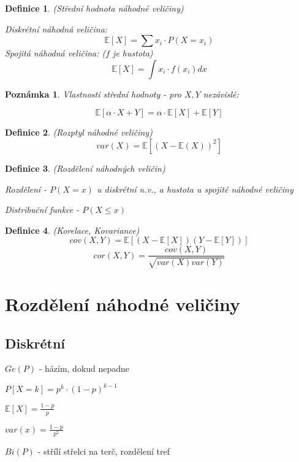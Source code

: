 \documentclass[a4paper,10pt,titlepage]{article} \usepackage[utf8]{inputenc}
\newtheorem{define}{Definice}
\newtheorem*{remark}{Poznámka}
\begin{document}
\begin{define} 
(Střední hodnota náhodné veličiny)

Diskrétní náhodná veličina:
\[
	\mathbb{E}[X] = \sum x_i \cdot P(X = x_i)
\]
Spojitá náhodná veličina: ($f$ je hustota)
\[
	\mathbb{E}[X] = \int x_i \cdot f(x_i) dx
\]
\end{define}

\begin{remark}
Vlastnosti střední hodnoty - pro $X,Y$ nezávislé:

\[
\mathbb{E}[\alpha \cdot X + Y] = \alpha \cdot \mathbb{E}[X] + \mathbb{E}[Y]
\]
\end{remark}

\begin{define} 
(Rozptyl náhodné veličiny)
\[
	var(X) = \mathbb{E}[(X - \mathbb{E} (X))^2]
\]
\end{define}

\begin{define}
(Rozdělení náhodných veličin)

Rozdělení - $P(X = x)$ u diskrétní n.v., a hustota u spojité náhodné veličiny

Distribuční funkce - $P(X \leq x)$

\end{define}

\begin{define}
(Korelace, Kovariance)
\[
cov(X,Y) = \mathbb{E}[(X-\mathbb{E}[X])(Y-\mathbb{E}[Y])]
\]
\[
cor(X,Y) = \frac{cov(X,Y)}{\sqrt{var(X)var(Y)}}
\]
\end{define}

\section{Rozdělení náhodné veličiny}

\subsection{Diskrétní}

{}

$Ge(P)$ - házím, dokud nepadne

$P[X=k] = p^k \cdot (1-p)^{k-1}$

$\mathbb{E}[X] = \frac{1-p}{p}$

$var(x) = \frac{1-p}{p^2}$


{}

$Bi(P)$ - střílí střelci na terč, rozdělení tref
\end{document}
